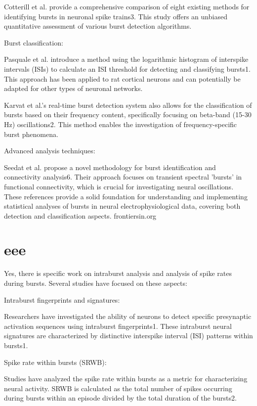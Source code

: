 \documentclass[a4paper,9pt]{extarticle}
\begin{document}
Cotterill et al. \cite{cotterill2016a} provide a comprehensive comparison of eight existing methods for identifying bursts in neuronal spike trains3. This study offers an unbiased quantitative assessment of various burst detection algorithms.

Burst classification:

Pasquale et al. \cite{pasquale2010a} introduce a method using the logarithmic histogram of interspike intervals (ISIs) to calculate an ISI threshold for detecting and classifying bursts1. This approach has been applied to rat cortical neurons and can potentially be adapted for other types of neuronal networks.

Karvat et al.'s \cite{karvat2022a} real-time burst detection system also allows for the classification of bursts based on their frequency content, specifically focusing on beta-band (15-30 Hz) oscillations2. This method enables the investigation of frequency-specific burst phenomena.

Advanced analysis techniques:

Seedat et al. propose a novel methodology for burst identification and connectivity analysis6. Their approach focuses on transient spectral 'bursts' in functional connectivity, which is crucial for investigating neural oscillations.
These references provide a solid foundation for understanding and implementing statistical analyses of bursts in neural electrophysiological data, covering both detection and classification aspects.
frontiersin.org


\section{eee}

Yes, there is specific work on intraburst analysis and analysis of spike rates during bursts. Several studies have focused on these aspects:

Intraburst fingerprints and signatures:

Researchers have investigated the ability of neurons to detect specific presynaptic activation sequences using intraburst fingerprints1. These intraburst neural signatures are characterized by distinctive interspike interval (ISI) patterns within bursts1.

Spike rate within bursts (SRWB):

Studies have analyzed the spike rate within bursts as a metric for characterizing neural activity. SRWB is calculated as the total number of spikes occurring during bursts within an episode divided by the total duration of the bursts2.
\end{document}
